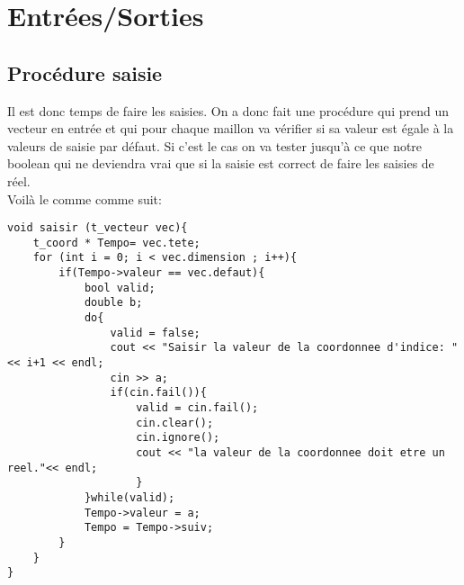 \documentclass[a4paper,11pt,final]{article}
\begin{document}
\section{Entrées/Sorties}
\subsection{Procédure saisie}

Il est donc temps de faire les saisies. On a donc fait une procédure qui prend un vecteur en entrée et qui pour chaque maillon va vérifier si sa valeur est égale à la valeurs de saisie par défaut. Si c'est le cas on va tester jusqu'à ce que notre boolean qui ne deviendra vrai que si la saisie est correct de faire les saisies de réel. \\
Voilà le comme comme suit:
\begin{verbatim}
void saisir (t_vecteur vec){
    t_coord * Tempo= vec.tete;
    for (int i = 0; i < vec.dimension ; i++){
        if(Tempo->valeur == vec.defaut){
            bool valid;
            double b;
            do{
                valid = false;
                cout << "Saisir la valeur de la coordonnee d'indice: "<< i+1 << endl;
                cin >> a;
                if(cin.fail()){
                    valid = cin.fail();
                    cin.clear();
                    cin.ignore();
                    cout << "la valeur de la coordonnee doit etre un reel."<< endl;
                    }
            }while(valid);
            Tempo->valeur = a;
            Tempo = Tempo->suiv;
        }
    }
}
\end{verbatim}
\end{document}
